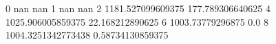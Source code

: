 0 nan nan
1 nan nan
2 1181.527099609375 177.789306640625
4 1025.906005859375 22.168212890625
6 1003.73779296875 0.0
8 1004.3251342773438 0.58734130859375
